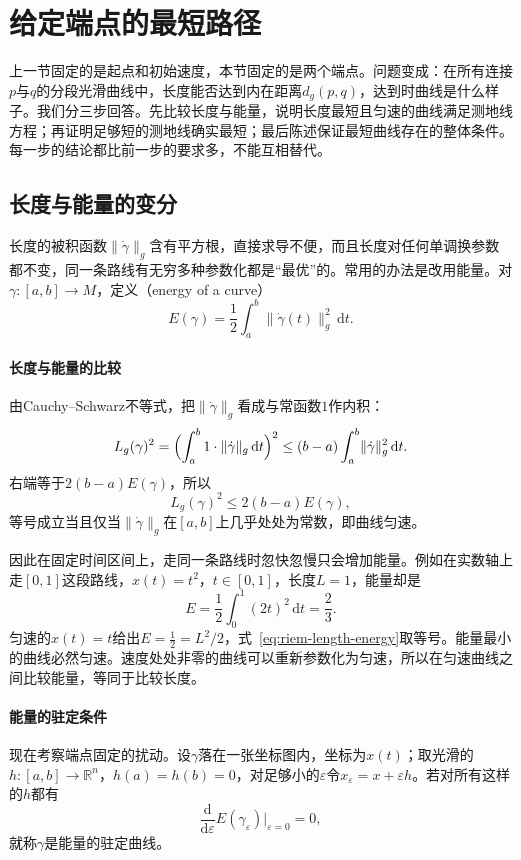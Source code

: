 \section{给定端点的最短路径}
\label{sec:riem-shortest-paths}

上一节固定的是起点和初始速度，本节固定的是两个端点。问题变成：在所有连接$p$与$q$的分段光滑曲线中，长度能否达到内在距离$d_g(p,q)$，达到时曲线是什么样子。我们分三步回答。先比较长度与能量，说明长度最短且匀速的曲线满足测地线方程；再证明足够短的测地线确实最短；最后陈述保证最短曲线存在的整体条件。每一步的结论都比前一步的要求多，不能互相替代。

\subsection{长度与能量的变分}
\label{sec:riem-length-energy-variation}

长度的被积函数$\lVert\dot\gamma\rVert_g$含有平方根，直接求导不便，而且长度对任何单调换参数都不变，同一条路线有无穷多种参数化都是“最优”的。常用的办法是改用能量。对$\gamma:[a,b]\to M$，定义（energy of a curve）
\begin{equation}
E(\gamma)=\frac12\int_a^b\lVert\dot\gamma(t)\rVert_g^2\,\mathrm dt .
\label{eq:riem-energy}
\end{equation}

\paragraph{长度与能量的比较}
由Cauchy--Schwarz不等式，把$\lVert\dot\gamma\rVert_g$看成与常函数$1$作内积：
\[
L_g(\gamma)^2=\Bigl(\int_a^b1\cdot\lVert\dot\gamma\rVert_g\,\mathrm dt\Bigr)^2\leq(b-a)\int_a^b\lVert\dot\gamma\rVert_g^2\,\mathrm dt .
\]
右端等于$2(b-a)E(\gamma)$，所以
\begin{equation}
L_g(\gamma)^2\leq2(b-a)E(\gamma),
\label{eq:riem-length-energy}
\end{equation}
等号成立当且仅当$\lVert\dot\gamma\rVert_g$在$[a,b]$上几乎处处为常数，即曲线匀速。

因此在固定时间区间上，走同一条路线时忽快忽慢只会增加能量。例如在实数轴上走$[0,1]$这段路线，$x(t)=t^2$，$t\in[0,1]$，长度$L=1$，能量却是
\[
E=\frac12\int_0^1(2t)^2\,\mathrm dt=\frac23 .
\]
匀速的$x(t)=t$给出$E=\tfrac12=L^2/2$，式~\eqref{eq:riem-length-energy}取等号。能量最小的曲线必然匀速。速度处处非零的曲线可以重新参数化为匀速，所以在匀速曲线之间比较能量，等同于比较长度。

\paragraph{能量的驻定条件}
现在考察端点固定的扰动。设$\gamma$落在一张坐标图内，坐标为$x(t)$；取光滑的$h:[a,b]\to\mathbb R^n$，$h(a)=h(b)=0$，对足够小的$\varepsilon$令$x_\varepsilon=x+\varepsilon h$。若对所有这样的$h$都有
\[
\frac{\mathrm d}{\mathrm d\varepsilon}E(\gamma_\varepsilon)\Big|_{\varepsilon=0}=0,
\]
就称$\gamma$是能量的驻定曲线。

